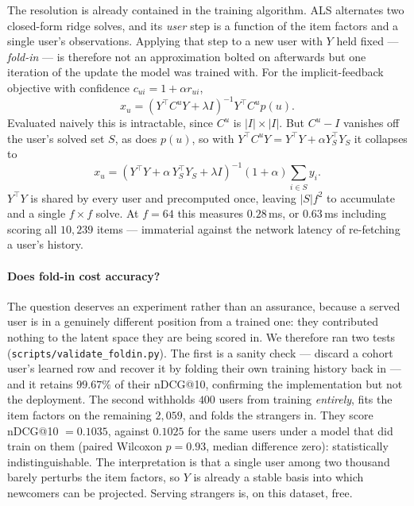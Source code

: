 \documentclass[12pt,a4paper]{article}
\newcommand{\ndcg}{nDCG}
\begin{document}
The resolution is already contained in the training algorithm. ALS alternates two
closed-form ridge solves, and its \emph{user} step is a function of the item factors and
a single user's observations. Applying that step to a new user with $Y$ held fixed ---
\emph{fold-in} --- is therefore not an approximation bolted on afterwards but one
iteration of the update the model was trained with. For the implicit-feedback objective
with confidence $c_{ui}=1+\alpha r_{ui}$,
\begin{equation}
x_u = \left(Y^{\top}C^{u}Y + \lambda I\right)^{-1} Y^{\top}C^{u}p(u).
\label{eq:foldin-general}
\end{equation}
Evaluated naively this is intractable, since $C^{u}$ is $|I|\times|I|$. But $C^{u}-I$
vanishes off the user's solved set $S$, as does $p(u)$, so with
$Y^{\top}C^{u}Y = Y^{\top}Y + \alpha Y_S^{\top}Y_S$ it collapses to
\begin{equation}
x_u = \left(Y^{\top}Y + \alpha\,Y_S^{\top}Y_S + \lambda I\right)^{-1}(1+\alpha)\!\!
      \sum_{i \in S}\! y_i .
\label{eq:foldin}
\end{equation}
$Y^{\top}Y$ is shared by every user and precomputed once, leaving $|S|f^2$ to accumulate
and a single $f \times f$ solve. At $f=64$ this measures $0.28$\,ms, or $0.63$\,ms
including scoring all $10{,}239$ items --- immaterial against the network latency of
re-fetching a user's history.

\paragraph{Does fold-in cost accuracy?} The question deserves an experiment rather than
an assurance, because a served user is in a genuinely different position from a trained
one: they contributed nothing to the latent space they are being scored in. We therefore
ran two tests (\texttt{scripts/validate\_foldin.py}). The first is a sanity check ---
discard a cohort user's learned row and recover it by folding their own training history
back in --- and it retains $99.67\%$ of their \ndcg{}@10, confirming the implementation
but not the deployment. The second withholds $400$ users from training \emph{entirely},
fits the item factors on the remaining $2{,}059$, and folds the strangers in. They score
\ndcg{}@10 $=0.1035$, against $0.1025$ for the same users under a model that did train on
them (paired Wilcoxon $p=0.93$, median difference zero): statistically indistinguishable.
The interpretation is that a single user among two thousand barely perturbs the item
factors, so $Y$ is already a stable basis into which newcomers can be projected. Serving
strangers is, on this dataset, free.
\end{document}
